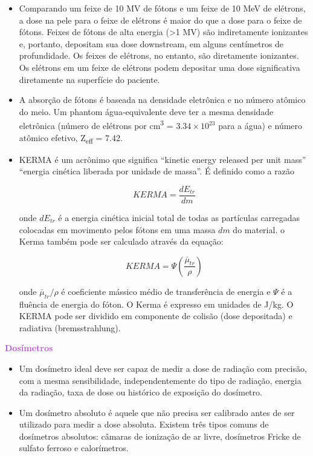 \documentclass[11pt,a4paper]{article}
\newcounter{exemplo}
\begin{document}
\begin{exemplo}
\begin{itemize}
        \item Comparando um feixe de 10 MV de fótons e um feixe de 10 MeV de elétrons, a dose na pele para o feixe de elétrons é maior do que a dose para o feixe de fótons. Feixes de fótons de alta energia (>1 MV) são indiretamente ionizantes e, portanto, depositam sua dose downstream, em alguns centímetros de profundidade. Os feixes de elétrons, no entanto, são diretamente ionizantes. Os elétrons em um feixe de elétrons podem depositar uma dose significativa diretamente na superfície do paciente.
        
        \item A absorção de fótons é baseada na densidade eletrônica e no número atômico do meio. Um phantom água-equivalente deve ter a mesma densidade eletrônica (número de elétrons por \unit{cm^3} =  $3.34 \times 10^{23}$ para a água) e número atômico efetivo, Z\textsubscript{eff} = 7.42.
        
        \item KERMA é um acrônimo que significa “kinetic energy released per unit mass” “energia cinética liberada por unidade de massa”. É definido como a razão
        
            $$KERMA = \frac{dE_{tr}}{dm}$$

        onde $dE_{tr}$ é a energia cinética inicial total de todas as partículas carregadas colocadas em movimento pelos fótons em uma massa $dm$ do material. o Kerma também pode ser calculado através da equação:

            $$KERMA = \Psi \left(\frac{\bar{\mu}_{tr}}{\rho}\right)$$

        onde $\bar{\mu}_{tr}/\rho$ é coeficiente mássico médio de transferência de energia e $\Psi$ é a fluência de energia do fóton. O Kerma é expresso em unidades de J/kg. O KERMA pode ser dividido em componente de colisão (dose depositada) e radiativa (bremsstrahlung).
    \end{itemize}

    \textcolor{MediumOrchid}{\LobsterTwo\textbf{Dosímetros}}
    \begin{itemize}
        \item Um dosímetro ideal deve ser capaz de medir a dose de radiação com precisão, com a mesma sensibilidade, independentemente do tipo de radiação, energia da radiação, taxa de dose ou histórico de exposição do dosímetro.
        
        \item Um dosímetro absoluto é aquele que não precisa ser calibrado antes de ser utilizado para medir a dose absoluta. Existem três tipos comuns de dosímetros absolutos: câmaras de ionização de ar livre, dosímetros Fricke de sulfato ferroso  e calorímetros.
        

\end{itemize}
\end{exemplo}
\end{document}
